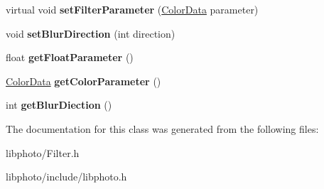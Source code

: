 \begin{DoxyCompactItemize}
\item 
\hypertarget{classFilter_a88314088e678c9a7cdbe0d0557385fa8}{virtual void {\bfseries set\-Filter\-Parameter} (\hyperlink{classColorData}{Color\-Data} parameter)}\label{classFilter_a88314088e678c9a7cdbe0d0557385fa8}

\item 
\hypertarget{classFilter_ada9d5f112e217c9bcf413093eae2a1e9}{void {\bfseries set\-Blur\-Direction} (int direction)}\label{classFilter_ada9d5f112e217c9bcf413093eae2a1e9}

\item 
\hypertarget{classFilter_a9f741b045bf1d57e485f116ce62ebac1}{float {\bfseries get\-Float\-Parameter} ()}\label{classFilter_a9f741b045bf1d57e485f116ce62ebac1}

\item 
\hypertarget{classFilter_abf85cdf0cda6dbe1dbcd6b8813aeecf3}{\hyperlink{classColorData}{Color\-Data} {\bfseries get\-Color\-Parameter} ()}\label{classFilter_abf85cdf0cda6dbe1dbcd6b8813aeecf3}

\item 
\hypertarget{classFilter_a465a168fc580c773e58d4df2f3db5968}{int {\bfseries get\-Blur\-Diection} ()}\label{classFilter_a465a168fc580c773e58d4df2f3db5968}

\end{DoxyCompactItemize}


The documentation for this class was generated from the following files\-:\begin{DoxyCompactItemize}
\item 
libphoto/Filter.\-h\item 
libphoto/include/libphoto.\-h\end{DoxyCompactItemize}
